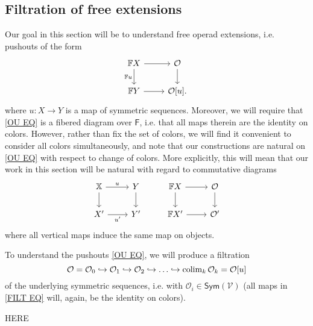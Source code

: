 \documentclass[a4paper,10pt
,draft
]{article}%
\renewcommand{\1}{\eta}%
\begin{document}
\subsection{Filtration of free extensions}



Our goal in this section will be to understand free operad extensions, i.e. pushouts of the form 
\begin{equation}\label{OU EQ}
            \begin{tikzcd}
                  \mathbb F X \arrow[d, "\mathbb{F}u"'] \arrow[r]
                  &
                  \O \arrow[d]
                  \\
                  \mathbb F Y \arrow[r]
                  &
                  \O[u].
            \end{tikzcd}
\end{equation}
where $u \colon X \to Y$ is a map of symmetric sequences.
Moreover, we will require that \eqref{OU EQ} is a fibered diagram over $\mathsf{F}$, i.e. that all maps therein are the identity on colors.
However, rather than fix the set of colors, 
we will find it convenient to consider all colors simultaneously, 
and note that our constructions are natural 
on \eqref{OU EQ} with respect to change of colors.
More explicitly, this will mean that our work in this section will be natural with regard to commutative diagrams
\begin{equation}
	\begin{tikzcd}
		\mathbb X \arrow[r, "u"',swap] \arrow[d]
	&
		Y \arrow[d]
&
		\mathbb F X \arrow[d] \arrow[r]
	&
		\O \arrow[d]
\\
		X' \arrow[r, "u'"']
	&
		Y'
&
		\mathbb F X' \arrow[r]
	&
		\O'
	\end{tikzcd}
\end{equation}
where all vertical maps induce the same map on objects.


To understand the pushouts \eqref{OU EQ},
we will produce a filtration
\begin{equation}\label{FILT EQ}
      \O = \O_0 \into \O_1 \into \O_2 \into \dots \into \colim_k \O_k = \O[u]
\end{equation}
of the underlying symmetric sequences, i.e. with 
$\mathcal{O}_i \in \mathsf{Sym}(\mathcal{V})$
(all maps in \ref{FILT EQ} will, again, be the identity on colors).

{\color{red} HERE}



\newpage
\end{document}
